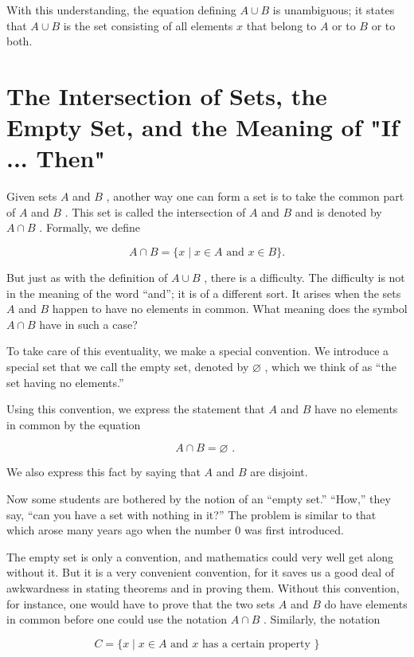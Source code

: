 With this understanding, the equation defining \(A \cup  B\) is unambiguous; it states that \(A \cup  B\) is the set consisting of all elements \(x\) that belong to \(A\) or to \(B\) or to both.

\section*{The Intersection of Sets, the Empty Set, and the Meaning of "If ... Then"}

Given sets \(A\) and \(B\) , another way one can form a set is to take the common part of \(A\) and \(B\) . This set is called the intersection of \(A\) and \(B\) and is denoted by \(A \cap  B\) . Formally, we define

\[
A \cap  B = \{ x \mid  x \in  A\text{ and }x \in  B\} .
\]

But just as with the definition of \(A \cup  B\) , there is a difficulty. The difficulty is not in the meaning of the word ``and''; it is of a different sort. It arises when the sets \(A\) and \(B\) happen to have no elements in common. What meaning does the symbol \(A \cap  B\) have in such a case?

To take care of this eventuality, we make a special convention. We introduce a special set that we call the empty set, denoted by \(\varnothing\) , which we think of as ``the set having no elements.''

Using this convention, we express the statement that \(A\) and \(B\) have no elements in common by the equation

\[
A \cap  B = \varnothing \text{ . }
\]

We also express this fact by saying that \(A\) and \(B\) are disjoint.

Now some students are bothered by the notion of an ``empty set.'' ``How,'' they say, ``can you have a set with nothing in it?'' The problem is similar to that which arose many years ago when the number 0 was first introduced.

The empty set is only a convention, and mathematics could very well get along without it. But it is a very convenient convention, for it saves us a good deal of awkwardness in stating theorems and in proving them. Without this convention, for instance, one would have to prove that the two sets \(A\) and \(B\) do have elements in common before one could use the notation \(A \cap  B\) . Similarly, the notation

\[
C = \{ x \mid  x \in  A\text{ and }x\text{ has a certain property }\}
\]

